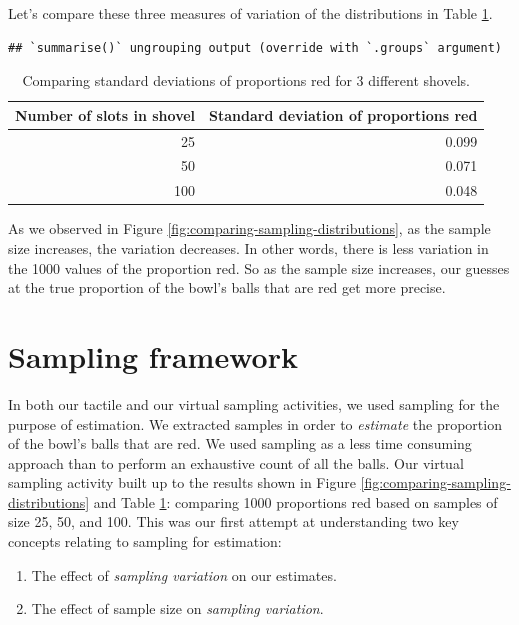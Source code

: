 \documentclass[
]{book}
\providecommand{\tightlist}{%
  \setlength{\itemsep}{0pt}\setlength{\parskip}{0pt}}
\begin{document}
Let's compare these three measures of variation of the distributions in Table \ref{tab:comparing-n}.

\begin{verbatim}
## `summarise()` ungrouping output (override with `.groups` argument)
\end{verbatim}

\begin{table}[!h]

\caption{\label{tab:comparing-n}Comparing standard deviations of proportions red for 3 different shovels.}
\centering
\fontsize{10}{12}\selectfont
\begin{tabular}[t]{rr}
\toprule
Number of slots in shovel & Standard deviation of proportions red\\
\midrule
25 & 0.099\\
50 & 0.071\\
100 & 0.048\\
\bottomrule
\end{tabular}
\end{table}

As we observed in Figure \ref{fig:comparing-sampling-distributions}, as the sample size increases, the variation decreases. In other words, there is less variation in the 1000 values of the proportion red. So as the sample size increases, our guesses at the true proportion of the bowl's balls that are red get more precise.

\hypertarget{sampling-framework}{%
\section{Sampling framework}\label{sampling-framework}}

In both our tactile and our virtual sampling activities, we used sampling for the purpose of estimation. We extracted samples in order to \emph{estimate} the proportion of the bowl's balls that are red. We used sampling as a less time consuming approach than to perform an exhaustive count of all the balls. Our virtual sampling activity built up to the results shown in Figure \ref{fig:comparing-sampling-distributions} and Table \ref{tab:comparing-n}: comparing 1000 proportions red based on samples of size 25, 50, and 100. This was our first attempt at understanding two key concepts relating to sampling for estimation:

\begin{enumerate}
\def\labelenumi{\arabic{enumi}.}
\tightlist
\item
  The effect of \emph{sampling variation} on our estimates.
\item
  The effect of sample size on \emph{sampling variation}.
\end{enumerate}
\end{document}

